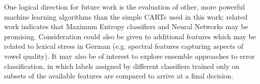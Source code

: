 \documentclass[a4paper]{article}
\begin{document}

	One logical direction for future work is the evaluation of other, more powerful machine learning algorithms than the simple CARTs used in this work; related work indicates that Maximum Entropy classifiers \cite{Kim2011} and Neural Networks \cite{Shahin2012} may be promising. Consideration could also be given to additional features which may be related to lexical stress in German (e.g. spectral features capturing aspects of vowel quality). It may also be of interest to explore ensemble approaches to error classification, in which labels assigned by different classifiers trained only on subsets of the available features are compared to arrive at a final decision.


  



  \eightpt
  

  
\end{document}

